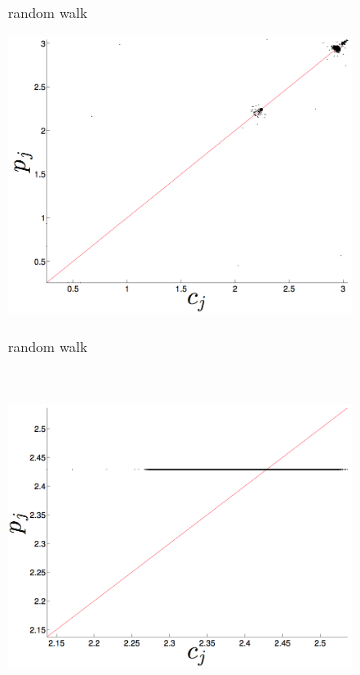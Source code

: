 \begin{figure}[htbp]
\begin{subfigure}{0.6\columnwidth}
    \caption{\gcc\\ random walk }
    \label{fig:gccRW}
  \end{subfigure}%
     \begin{subfigure}{0.6\columnwidth}
    \includegraphics[width=\columnwidth]{figs/svdfiveRWForecast.png}
    \caption{\svdfive\\ random walk}
    \label{fig:svd5RW}
  \end{subfigure}%
  \\  
      \begin{subfigure}{0.6\columnwidth}
    \includegraphics[width=\columnwidth]{figs/colMeanForecast.png}

\end{subfigure}
\end{figure}
